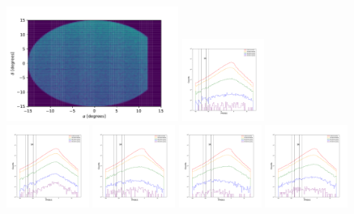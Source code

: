 \documentclass[12pt,prd]{article}
\begin{document}
\begin{figure}[h!]
\centering
\includegraphics[width=0.5\textwidth]{../figures/histogram2dgaiascan_l101_2_b58_4_ra212_7_dec55_2_npy.pdf}
\includegraphics[width=0.24\textwidth]{../figures/scanning_plotsgaiascan_l101_2_b58_4_ra212_7_dec55_2_npy_0.pdf}
\includegraphics[width=0.24\textwidth]{../figures/scanning_plotsgaiascan_l101_2_b58_4_ra212_7_dec55_2_npy_1.pdf}
\includegraphics[width=0.24\textwidth]{../figures/scanning_plotsgaiascan_l101_2_b58_4_ra212_7_dec55_2_npy_2.pdf}
\includegraphics[width=0.24\textwidth]{../figures/scanning_plotsgaiascan_l101_2_b58_4_ra212_7_dec55_2_npy_3.pdf}
\includegraphics[width=0.24\textwidth]{../figures/scanning_plotsgaiascan_l101_2_b58_4_ra212_7_dec55_2_npy_4.pdf}

\end{figure}
\end{document}
